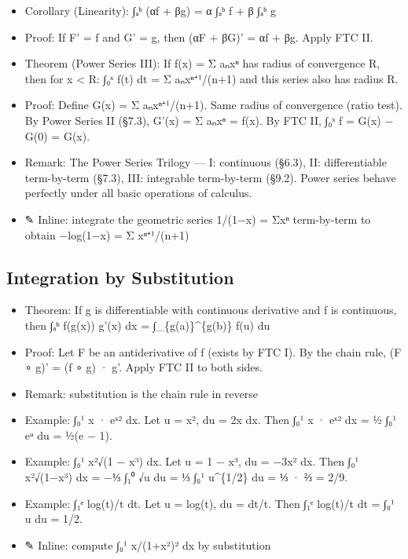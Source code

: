 \documentclass[
  10pt,
  letterpaper,
]{scrbook}
\providecommand{\tightlist}{%
  \setlength{\itemsep}{0pt}\setlength{\parskip}{0pt}}
\begin{document}
\begin{itemize}
\tightlist
\item
  Corollary (Linearity): ∫ₐᵇ (αf + βg) = α ∫ₐᵇ f + β ∫ₐᵇ g
\item
  Proof: If F' = f and G' = g, then (αF + βG)' = αf + βg. Apply FTC II.
\item
  Theorem (Power Series III): If f(x) = Σ aₙxⁿ has radius of convergence
  R, then for \textbar x\textbar{} \textless{} R: ∫₀ˣ f(t) dt = Σ
  aₙxⁿ⁺¹/(n+1) and this series also has radius R.
\item
  Proof: Define G(x) = Σ aₙxⁿ⁺¹/(n+1). Same radius of convergence (ratio
  test). By Power Series II (§7.3), G'(x) = Σ aₙxⁿ = f(x). By FTC II,
  ∫₀ˣ f = G(x) − G(0) = G(x).
\item
  Remark: The Power Series Trilogy --- I: continuous (§6.3), II:
  differentiable term-by-term (§7.3), III: integrable term-by-term
  (§9.2). Power series behave perfectly under all basic operations of
  calculus.
\item
  ✎ Inline: integrate the geometric series 1/(1−x) = Σxⁿ term-by-term to
  obtain −log(1−x) = Σ xⁿ⁺¹/(n+1)
\end{itemize}

\subsection{Integration by
Substitution}\label{integration-by-substitution}

\begin{itemize}
\tightlist
\item
  Theorem: If g is differentiable with continuous derivative and f is
  continuous, then ∫ₐᵇ f(g(x)) g'(x) dx = ∫\_\{g(a)\}\^{}\{g(b)\} f(u)
  du
\item
  Proof: Let F be an antiderivative of f (exists by FTC I). By the chain
  rule, (F ∘ g)' = (f ∘ g) · g'. Apply FTC II to both sides.
\item
  Remark: substitution is the chain rule in reverse
\item
  Example: ∫₀¹ x · eˣ² dx. Let u = x², du = 2x dx. Then ∫₀¹ x · eˣ² dx =
  ½ ∫₀¹ eᵘ du = ½(e − 1).
\item
  Example: ∫₀¹ x²√(1 − x³) dx. Let u = 1 − x³, du = −3x² dx. Then ∫₀¹
  x²√(1−x³) dx = −⅓ ∫₁⁰ √u du = ⅓ ∫₀¹ u\^{}\{1/2\} du = ⅓ · ⅔ = 2/9.
\item
  Example: ∫₁ᵉ log(t)/t dt. Let u = log(t), du = dt/t. Then ∫₁ᵉ log(t)/t
  dt = ∫₀¹ u du = 1/2.
\item
  ✎ Inline: compute ∫₀¹ x/(1+x²)² dx by substitution
\end{itemize}
\end{document}
